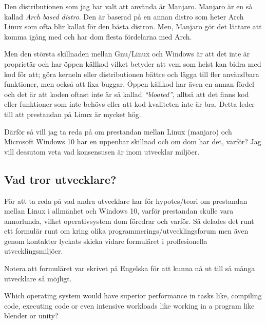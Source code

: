 \documentclass[12pt, a4paper]{report}
\begin{document}
    Den distributionen som jag har valt att använda är Manjaro\cite{manjaro}. Manjaro är en så kallad \textit{Arch based distro}. Den är baserad på en annan distro som heter Arch Linux som ofta blir kallat för den bästa distron. Men, Manjaro gör det lättare att komma igång med och har dom flesta fördelarna med Arch.

    Men den största skillnaden mellan Gnu/Linux och Windows är att det inte är proprietär och har öppen källkod vilket betyder att vem som helst kan bidra med kod för att; göra kerneln eller distributionen bättre och lägga till fler användbara funktioner, men också att fixa buggar. Öppen källkod har även en annan fördel och det är att koden oftast inte är så kallad \textit{``bloated''}, alltså att det finns kod eller funktioner som inte behövs eller att kod kvaliteten inte är bra. Detta leder till att prestandan på Linux är mycket hög. 
    
    Därför så vill jag ta reda på om prestandan mellan Linux (manjaro) och Microsoft Windows 10 har en uppenbar skillnad och om dom har det, varför? Jag vill dessutom veta vad konsensusen är inom utvecklar miljöer.
\subsection{Vad tror utvecklare?}

    För att ta reda på vad andra utvecklare har för hypotes/teori om prestandan mellan Linux i allmänhet och Windows 10, varför prestandan skulle vara annorlunda, vilket operativsystem dom föredrar och varför.  Så delades det runt ett formulär runt om kring olika programmerings/utvecklingsforum men även genom kontakter lyckats skicka vidare formuläret i proffesionella utvecklingsmiljöer.

    Notera att formuläret var skrivet på Engelska för att kunna nå ut till så många utvecklare så möjligt.


    \vspace{8.7cm}


    \large {Which operating system would have superior performance in tasks like, compiling code, executing code or even intensive workloads like working in a program  like blender or unity?}

    \vspace{.2cm}

\end{document}
